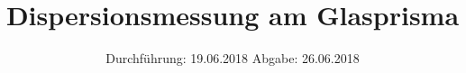 

\subject{V402}
\title{Dispersionsmessung am Glasprisma}
\date{%
  Durchführung: 19.06.2018
  \hspace{3em}
  Abgabe: 26.06.2018
}



\maketitle
\thispagestyle{empty}
\tableofcontents
\newpage






\printbibliography{}


